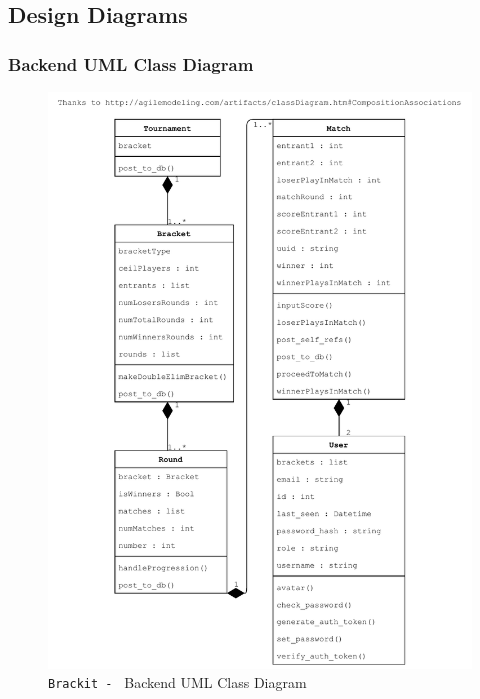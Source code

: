 \documentclass{article}
\begin{document}
\clearpage
\subsection{Design Diagrams}
\subsubsection{Backend UML Class Diagram}
\begin{center}
    \begin{figure}[htp]
        \centering
        \includegraphics[width=13cm]{../diagrams/uml_class_tourn.pdf}
        \caption{\texttt{Brackit - } Backend UML Class Diagram}
        \end{figure}
\end{center}
\clearpage
\end{document}
